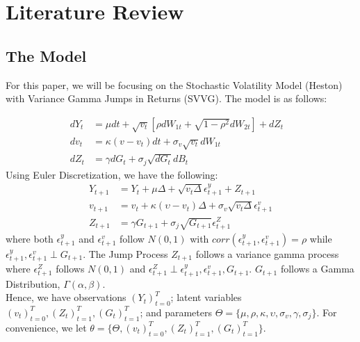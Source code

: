 \documentclass[12pt]{article}
\theoremstyle{definition}
\begin{document}
\section{Literature Review}
\subsection{The Model}
For this paper, we will be focusing on the Stochastic Volatility Model (Heston) with Variance Gamma Jumps in Returns (SVVG). The model is as follows:

\begin{equation}
	\begin{aligned}
		dY_{t} &=\mu dt+\sqrt{v_{t}}[\rho dW_{1t}+\sqrt{1-\rho ^{2}} dW_{2t}] + dZ_{t} &\\
		dv_{t} &= \kappa (v - v_{t})dt+\sigma _{v}\sqrt{v_{t}}dW_{1t} &\\
		dZ_{t} &= \gamma dG_{t} + \sigma _{j} \sqrt{dG_{t}}dB_{t}
	\end{aligned}
\end{equation}
Using Euler Discretization, we have the following:
\begin{equation}
	\begin{aligned}
		Y_{t+1} &= Y_{t} + \mu\Delta + \sqrt{v_{t}\Delta}\epsilon_{t+1}^{y}+Z_{t+1}\\
		v_{t+1} &= v_{t} + \kappa(\upsilon - v_{t})\Delta + \sigma_{v}\sqrt{v_{t}\Delta}\epsilon_{t+1}^{v}\\
		Z_{t+1} &= \gamma G_{t+1} + \sigma_{j}\sqrt{G_{t+1}}\epsilon_{t+1}^{Z}
	\end{aligned}
\end{equation}
\justify
where both $\epsilon_{t+1}^{y}$ and $\epsilon_{t+1}^{v}$ follow $N(0,1)$ with $corr(\epsilon_{t+1}^{y},\epsilon_{t+1}^{v})=\rho$ while $\epsilon_{t+1}^{y},\epsilon_{t+1}^{v} \perp G_{t+1}$. The Jump Process $Z_{t+1}$ follows a variance gamma process where $\epsilon_{t+1}^{Z}$ follows $N(0,1)$ and $\epsilon_{t+1}^{Z} \perp \epsilon_{t+1}^{y},\epsilon_{t+1}^{v},G_{t+1}$. $G_{t+1}$ follows a Gamma Distribution, $\Gamma (\alpha,\beta)$.\\
\bigskip
Hence, we have observations $(Y_{t})_{t=0}^{T}$; latent variables $(v_{t})_{t=0}^{T},(Z_{t})_{t=1}^{T},(G_{t})_{t=1}^{T}$; and parameters $\Theta = \{\mu,\rho,\kappa,\upsilon,\sigma_{v},\gamma,\sigma_{j}\}$. For convenience, we let $\theta = \{\Theta,(v_{t})_{t=0}^{T},(Z_{t})_{t=1}^{T},(G_{t})_{t=1}^{T} \}$.
\end{document}
